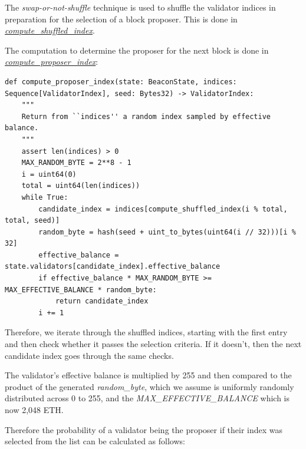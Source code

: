 The \textit{swap-or-not-shuffle} technique \cite{hoang2014}  is used to shuffle the validator indices in preparation for the selection of a block proposer. This is done in \href{https://github.com/ethereum/consensus-specs/blob/9c35b7384e78da643f51f9936c578da7d04db698/specs/phase0/beacon-chain.md#compute_shuffled_index}{\textit{compute\_shuffled\_index}}.

The computation to determine the proposer for the next block is done in \href{https://github.com/ethereum/consensus-specs/blob/9c35b7384e78da643f51f9936c578da7d04db698/specs/phase0/beacon-chain.md#compute_proposer_index}{\textit{compute\_proposer\_index}}: 

\lstset{language=Python}

\begin{lstlisting}
def compute_proposer_index(state: BeaconState, indices: Sequence[ValidatorIndex], seed: Bytes32) -> ValidatorIndex:
    """
    Return from ``indices'' a random index sampled by effective balance.
    """
    assert len(indices) > 0
    MAX_RANDOM_BYTE = 2**8 - 1
    i = uint64(0)
    total = uint64(len(indices))
    while True:
        candidate_index = indices[compute_shuffled_index(i % total, total, seed)]
        random_byte = hash(seed + uint_to_bytes(uint64(i // 32)))[i % 32]
        effective_balance = state.validators[candidate_index].effective_balance
        if effective_balance * MAX_RANDOM_BYTE >= MAX_EFFECTIVE_BALANCE * random_byte:
            return candidate_index
        i += 1
\end{lstlisting}


Therefore, we iterate through the shuffled indices, starting with the first entry and then check whether it passes the selection criteria. If it doesn't, then the next candidate index goes through the same checks.

The validator's effective balance is multiplied by 255 and then compared to the product of the generated \textit{random\_byte}, which we assume is uniformly randomly distributed across 0 to 255,  and the \textit{MAX\_EFFECTIVE\_BALANCE} which is now 2,048 ETH. 

Therefore the probability of a validator being the proposer if their index was selected from the list can be calculated as follows:

